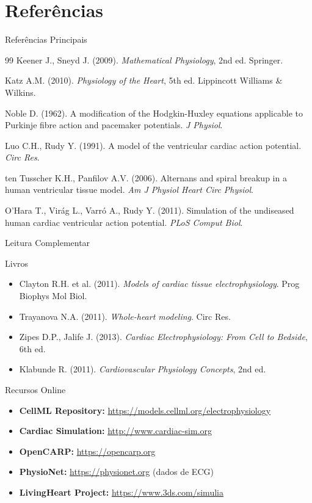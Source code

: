 \section{Referências}

\begin{frame}{Referências Principais}
\begin{thebibliography}{99}
 Keener J., Sneyd J. (2009). \textit{Mathematical Physiology}, 2nd ed. Springer.

 Katz A.M. (2010). \textit{Physiology of the Heart}, 5th ed. Lippincott Williams \& Wilkins.

 Noble D. (1962). A modification of the Hodgkin-Huxley equations applicable to Purkinje fibre action and pacemaker potentials. \textit{J Physiol}.

 Luo C.H., Rudy Y. (1991). A model of the ventricular cardiac action potential. \textit{Circ Res}.

 ten Tusscher K.H., Panfilov A.V. (2006). Alternans and spiral breakup in a human ventricular tissue model. \textit{Am J Physiol Heart Circ Physiol}.

 O'Hara T., Virág L., Varró A., Rudy Y. (2011). Simulation of the undiseased human cardiac ventricular action potential. \textit{PLoS Comput Biol}.
\end{thebibliography}
\end{frame}

\begin{frame}{Leitura Complementar}
\begin{block}{Livros}
\begin{itemize}
    \item Clayton R.H. et al. (2011). \textit{Models of cardiac tissue electrophysiology}. Prog Biophys Mol Biol.
    \item Trayanova N.A. (2011). \textit{Whole-heart modeling}. Circ Res.
    \item Zipes D.P., Jalife J. (2013). \textit{Cardiac Electrophysiology: From Cell to Bedside}, 6th ed.
    \item Klabunde R. (2011). \textit{Cardiovascular Physiology Concepts}, 2nd ed.
\end{itemize}
\end{block}

\begin{block}{Recursos Online}
\begin{itemize}
    \item \textbf{CellML Repository:} \url{https://models.cellml.org/electrophysiology}
    \item \textbf{Cardiac Simulation:} \url{http://www.cardiac-sim.org}
    \item \textbf{OpenCARP:} \url{https://opencarp.org}
    \item \textbf{PhysioNet:} \url{https://physionet.org} (dados de ECG)
    \item \textbf{LivingHeart Project:} \url{https://www.3ds.com/simulia}
\end{itemize}
\end{block}
\end{frame}

